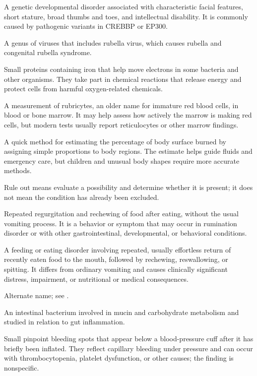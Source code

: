  A genetic developmental disorder associated with characteristic facial features,
short stature, broad thumbs and toes, and intellectual disability. It is commonly caused by pathogenic variants in
CREBBP or EP300.

 A genus of viruses that includes rubella virus, which causes rubella and congenital rubella syndrome.

 Small proteins containing iron that help move electrons in some bacteria and other organisms. They take part in chemical reactions that release energy and protect cells from harmful oxygen-related chemicals.

 A measurement of rubricytes, an older name for immature red blood cells, in blood or bone marrow. It may help assess how actively the marrow is making red cells, but modern tests usually report reticulocytes or other marrow findings.

 A quick method for estimating the percentage of body surface burned by assigning simple proportions to body regions. The estimate helps guide fluids and emergency care, but children and unusual body shapes require more accurate methods.

 Rule out means evaluate a possibility and determine whether it is present; it does not mean the condition has already been excluded.

 Repeated regurgitation and rechewing of food after eating, without the usual vomiting process. It is a behavior or symptom that may occur in rumination disorder or with other gastrointestinal, developmental, or behavioral conditions.

 A feeding or eating disorder involving repeated, usually effortless return of recently eaten food to the mouth, followed by rechewing, reswallowing, or spitting. It differs from ordinary vomiting and causes clinically significant distress, impairment, or nutritional or medical consequences.

 Alternate name; see .

 An intestinal bacterium involved in mucin and carbohydrate metabolism and studied in relation to gut inflammation.

 Small pinpoint bleeding spots that appear below a blood-pressure cuff after it has briefly been inflated. They reflect capillary bleeding under pressure and can occur with thrombocytopenia, platelet dysfunction, or other causes; the finding is nonspecific.

